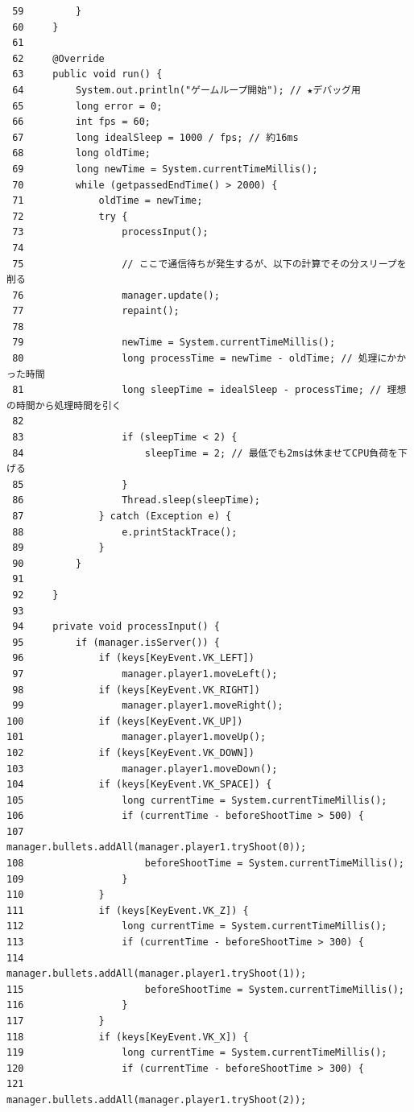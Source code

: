\documentclass[11pt,a4j]{jarticle}
\begin{document}
\begin{small}
\begin{verbatim}
 59         }
 60     }
 61 
 62     @Override
 63     public void run() {
 64         System.out.println("ゲームループ開始"); // ★デバッグ用
 65         long error = 0;
 66         int fps = 60;
 67         long idealSleep = 1000 / fps; // 約16ms
 68         long oldTime;
 69         long newTime = System.currentTimeMillis();
 70         while (getpassedEndTime() > 2000) {
 71             oldTime = newTime;
 72             try {
 73                 processInput();
 74 
 75                 // ここで通信待ちが発生するが、以下の計算でその分スリープを削る
 76                 manager.update();
 77                 repaint();
 78 
 79                 newTime = System.currentTimeMillis();
 80                 long processTime = newTime - oldTime; // 処理にかかった時間
 81                 long sleepTime = idealSleep - processTime; // 理想の時間から処理時間を引く
 82 
 83                 if (sleepTime < 2) {
 84                     sleepTime = 2; // 最低でも2msは休ませてCPU負荷を下げる
 85                 }
 86                 Thread.sleep(sleepTime);
 87             } catch (Exception e) {
 88                 e.printStackTrace();
 89             }
 90         }
 91 
 92     }
 93 
 94     private void processInput() {
 95         if (manager.isServer()) {
 96             if (keys[KeyEvent.VK_LEFT])
 97                 manager.player1.moveLeft();
 98             if (keys[KeyEvent.VK_RIGHT])
 99                 manager.player1.moveRight();
100             if (keys[KeyEvent.VK_UP])
101                 manager.player1.moveUp();
102             if (keys[KeyEvent.VK_DOWN])
103                 manager.player1.moveDown();
104             if (keys[KeyEvent.VK_SPACE]) {
105                 long currentTime = System.currentTimeMillis();
106                 if (currentTime - beforeShootTime > 500) {
107                     manager.bullets.addAll(manager.player1.tryShoot(0));
108                     beforeShootTime = System.currentTimeMillis();
109                 }
110             }
111             if (keys[KeyEvent.VK_Z]) {
112                 long currentTime = System.currentTimeMillis();
113                 if (currentTime - beforeShootTime > 300) {
114                     manager.bullets.addAll(manager.player1.tryShoot(1));
115                     beforeShootTime = System.currentTimeMillis();
116                 }
117             }
118             if (keys[KeyEvent.VK_X]) {
119                 long currentTime = System.currentTimeMillis();
120                 if (currentTime - beforeShootTime > 300) {
121                     manager.bullets.addAll(manager.player1.tryShoot(2));

\end{verbatim}
\end{small}
\end{document}
